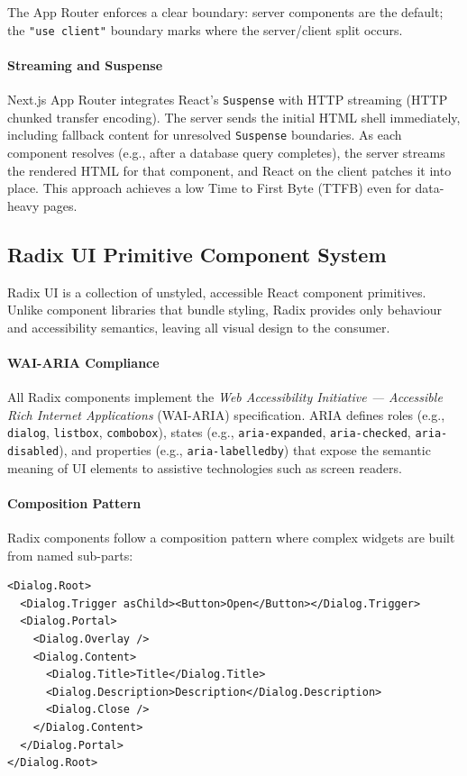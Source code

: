 The App Router enforces a clear boundary: server components are the default; the \texttt{"use client"} boundary marks where the server/client split occurs.

\paragraph{Streaming and Suspense}

Next.js App Router integrates React's \texttt{Suspense} with HTTP streaming (HTTP chunked transfer encoding). The server sends the initial HTML shell immediately, including fallback content for unresolved \texttt{Suspense} boundaries. As each component resolves (e.g., after a database query completes), the server streams the rendered HTML for that component, and React on the client patches it into place. This approach achieves a low Time to First Byte (TTFB) even for data-heavy pages.

\subsection{Radix UI Primitive Component System}

Radix UI is a collection of unstyled, accessible React component primitives. Unlike component libraries that bundle styling, Radix provides only behaviour and accessibility semantics, leaving all visual design to the consumer.

\paragraph{WAI-ARIA Compliance}

All Radix components implement the \emph{Web Accessibility Initiative — Accessible Rich Internet Applications} (WAI-ARIA) specification. ARIA defines roles (e.g., \texttt{dialog}, \texttt{listbox}, \texttt{combobox}), states (e.g., \texttt{aria-expanded}, \texttt{aria-checked}, \texttt{aria-disabled}), and properties (e.g., \texttt{aria-labelledby}) that expose the semantic meaning of UI elements to assistive technologies such as screen readers.

\paragraph{Composition Pattern}

Radix components follow a composition pattern where complex widgets are built from named sub-parts:
\begin{verbatim}
<Dialog.Root>
  <Dialog.Trigger asChild><Button>Open</Button></Dialog.Trigger>
  <Dialog.Portal>
    <Dialog.Overlay />
    <Dialog.Content>
      <Dialog.Title>Title</Dialog.Title>
      <Dialog.Description>Description</Dialog.Description>
      <Dialog.Close />
    </Dialog.Content>
  </Dialog.Portal>
</Dialog.Root>
\end{verbatim}

